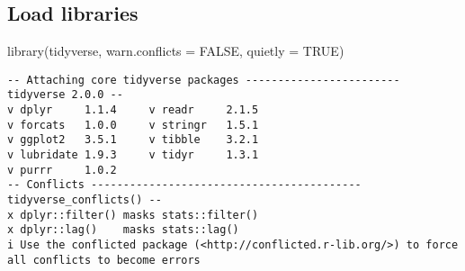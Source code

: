 \documentclass[
  letterpaper,
  DIV=11,
  numbers=noendperiod]{scrartcl}
\newenvironment{Shaded}{\begin{snugshade}}{\end{snugshade}}
\newcommand{\AttributeTok}[1]{\textcolor[rgb]{0.40,0.45,0.13}{#1}}
\newcommand{\ConstantTok}[1]{\textcolor[rgb]{0.56,0.35,0.01}{#1}}
\newcommand{\FunctionTok}[1]{\textcolor[rgb]{0.28,0.35,0.67}{#1}}
\newcommand{\NormalTok}[1]{\textcolor[rgb]{0.00,0.23,0.31}{#1}}
\begin{document}
\subsection{Load libraries}\label{load-libraries}

\begin{Shaded}
\begin{Highlighting}[]
\FunctionTok{library}\NormalTok{(tidyverse, }\AttributeTok{warn.conflicts =} \ConstantTok{FALSE}\NormalTok{, }\AttributeTok{quietly =} \ConstantTok{TRUE}\NormalTok{)}
\end{Highlighting}
\end{Shaded}

\begin{verbatim}
-- Attaching core tidyverse packages ------------------------ tidyverse 2.0.0 --
v dplyr     1.1.4     v readr     2.1.5
v forcats   1.0.0     v stringr   1.5.1
v ggplot2   3.5.1     v tibble    3.2.1
v lubridate 1.9.3     v tidyr     1.3.1
v purrr     1.0.2     
-- Conflicts ------------------------------------------ tidyverse_conflicts() --
x dplyr::filter() masks stats::filter()
x dplyr::lag()    masks stats::lag()
i Use the conflicted package (<http://conflicted.r-lib.org/>) to force all conflicts to become errors
\end{verbatim}
\end{document}
